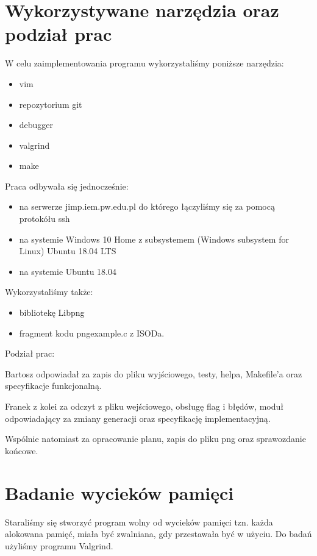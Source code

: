 \documentclass{article}
\begin{document}
\section{Wykorzystywane narzędzia oraz podział prac}

{\fontsize{14}{14}\selectfont
W celu zaimplementowania programu wykorzystaliśmy poniższe narzędzia:
\begin{itemize}
\item vim
\item repozytorium git
\item debugger
\item valgrind
\item make
\end{itemize}


Praca odbywała się jednocześnie:
\begin{itemize}
\item na serwerze jimp.iem.pw.edu.pl do którego łączyliśmy się za pomocą protokółu ssh
\item na systemie Windows 10 Home z subsystemem (Windows subsystem for Linux) Ubuntu 18.04 LTS
\item na systemie Ubuntu 18.04
\end{itemize}

Wykorzystaliśmy także:
\begin{itemize}
\item bibliotekę Libpng
\item fragment kodu pngexample.c z ISODa.

\end{itemize}
Podział prac:


Bartosz odpowiadał za zapis do pliku wyjściowego, testy, helpa, Makefile'a oraz specyfikacje funkcjonalną. 

Franek z kolei za odczyt z pliku wejściowego, obsługę flag i błędów, moduł odpowiadający za zmiany generacji oraz specyfikację implementacyjną.

Wspólnie natomiast za opracowanie planu, zapis do pliku png oraz sprawozdanie końcowe.

}
\newpage
{}
\section{Badanie wycieków pamięci}
Staraliśmy się stworzyć program wolny od wycieków pamięci tzn. każda alokowana pamięć, miała być zwalniana, gdy przestawała być w użyciu.
Do badań użyliśmy programu Valgrind.
\end{document}
